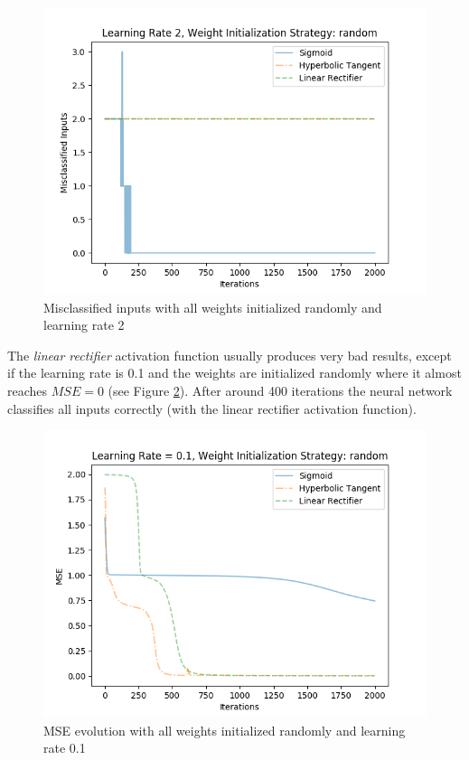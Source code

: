 \documentclass{article}
\begin{document}
\begin{figure}[H]
	\centering
	\includegraphics[width=0.9\linewidth]{img/5/sigmoid-inputs.png}
	\caption{Misclassified inputs with all weights initialized randomly and learning rate 2}
	\label{fig:best_result_sigmoid_inputs}
\end{figure}


The \emph{linear rectifier} activation function usually produces very bad results, except if the learning rate is 0.1 and the weights are initialized randomly where it almost reaches $MSE = 0$ (see Figure \ref{fig:best_result_linrect_mse}). After around 400 iterations the neural network classifies all inputs correctly (with the linear rectifier activation function).

\begin{figure}[H]
	\centering
	\includegraphics[width=0.9\linewidth]{img/5/linear-rectifier-mse.png}
	\caption{MSE evolution with all weights initialized randomly and learning rate 0.1}
	\label{fig:best_result_linrect_mse}
\end{figure}
\end{document}
